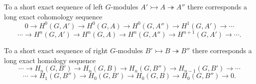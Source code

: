 To a short exact sequence of left $G$-modules $A' \rightarrowtail A \twoheadrightarrow A''$ there corresponds a long exact cohomology sequence
$$0 \to H^0(G, A') \to H^0(G, A) \to H^0(G, A'') \to H^1(G, A') \to \cdots$$
$$\cdots \to H^n(G, A') \to H^n(G, A) \to H^n(G, A'') \to H^{n+1}(G, A') \to \cdots.$$

To a short exact sequence of right $G$-modules $B' \rightarrowtail B \twoheadrightarrow B''$ there corresponds a long exact homology sequence
$$\cdots \to H_n(G, B') \to H_n(G, B) \to H_n(G, B'') \to H_{n-1}(G, B') \to \cdots$$
$$\cdots \to H_1(G, B'') \to H_0(G, B') \to H_0(G, B) \to H_0(G, B'') \to 0.$$
